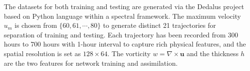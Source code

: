 \documentclass{article}
\DeclareMathOperator{\sech}{sech}
\begin{document}
The datasets for both training and testing are generated via the Dedalus project \cite{dedalus} based on Python language within a spectral framework. The maximum velocity $u_m$ is chosen from $\{60,61,\cdots,80\}$ to generate distinct 21 trajectories for separation of training and testing. Each trajectory has been recorded from 300 hours to 700 hours with 1-hour interval to capture rich physical features, and the spatial resolution is set as $128\times64$. The vorticity $w=\nabla\times\bm u$ and the thickness $h$ are the two features for network training and assimilation.

\end{document}
